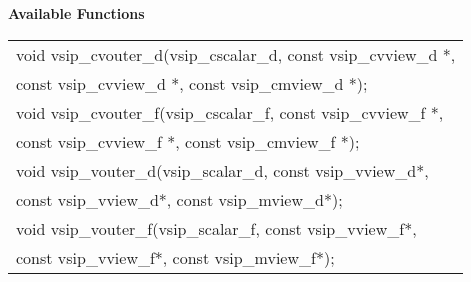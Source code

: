 \\\cvsiplh
\\ \hspace*{.8cm} \vspace*{.1cm} \textbf{Available Functions }
\\ \hspace*{1.1cm} {
\ttfamily
\begin{tabular}[H]{l}
void vsip\_cvouter\_d(vsip\_cscalar\_d, const vsip\_cvview\_d *,\\*\hspace{.6cm}const vsip\_cvview\_d *, const vsip\_cmview\_d *);\\
void vsip\_cvouter\_f(vsip\_cscalar\_f, const vsip\_cvview\_f *,\\*\hspace{.6cm}const vsip\_cvview\_f *, const vsip\_cmview\_f *);\\
void vsip\_vouter\_d(vsip\_scalar\_d, const vsip\_vview\_d*,\\*\hspace{.6cm}const vsip\_vview\_d*, const vsip\_mview\_d*);\\
void vsip\_vouter\_f(vsip\_scalar\_f, const vsip\_vview\_f*,\\*\hspace{.6cm}const vsip\_vview\_f*, const vsip\_mview\_f*);\\
\end{tabular}
}
\\\pyjvsiph
